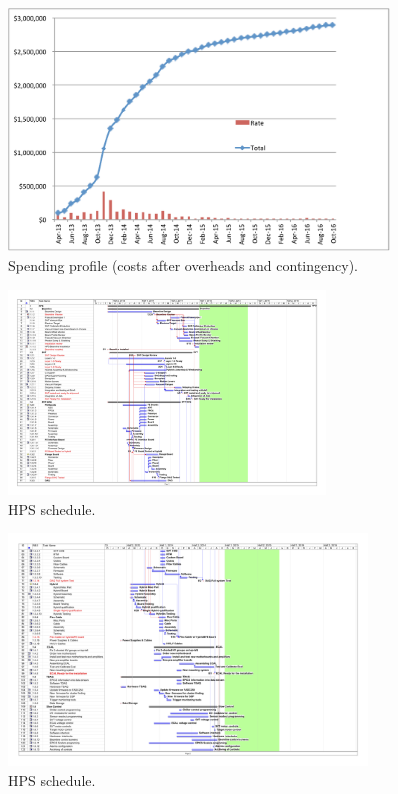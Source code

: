 \begin{figure}[h]
\centering
\includegraphics[width=0.9\textwidth]{cost_schedule/spending} 
\caption{Spending profile (costs after overheads and contingency).}
\label{fig:spending}
\end{figure}

\begin{figure}[h]
\centering
\includegraphics*[angle=90,width=0.75\textwidth]{cost_schedule/ScheduleHPSV470-1.jpg} 
\caption{HPS schedule.}
\label{fig:schedulea}
\end{figure}
\begin{figure}[h]
\centering
\includegraphics*[angle=90,width=0.85\textwidth]{cost_schedule/ScheduleHPSV470-2.jpg} 
\caption{HPS schedule.}
\label{fig:scheduleb}
\end{figure}

